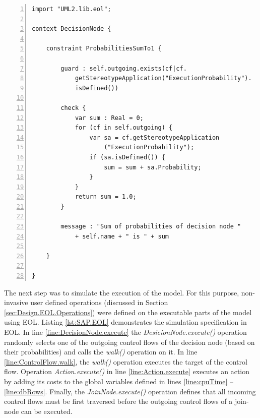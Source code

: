 \begin{lstlisting}[basicstyle=\ttfamily\footnotesize, flexiblecolumns=true, numbers=left, nolol=true, caption=Performance-Annotated Activity Diagram Constraints using EVL, label=lst:SAP.EVL, language=EVL, tabsize=2]
import "UML2.lib.eol";

context DecisionNode {
	
	constraint ProbabilitiesSumTo1 {
		
		guard : self.outgoing.exists(cf|cf.
			getStereotypeApplication("ExecutionProbability").
			isDefined())
		
		check {
			var sum : Real = 0;
			for (cf in self.outgoing) {
				var sa = cf.getStereotypeApplication
					("ExecutionProbability");
				if (sa.isDefined()) {
					sum = sum + sa.Probability;
				}
			}
			return sum = 1.0;
		}
		
		message : "Sum of probabilities of decision node " 
			+ self.name + " is " + sum 
		
	}
	
}
\end{lstlisting}

The next step was to simulate the execution of the model. For this purpose, non-invasive user defined operations (discussed in Section \ref{sec:Design.EOL.Operations}) were defined on the executable parts of the model using EOL. Listing \ref{lst:SAP.EOL} demonstrates the simulation specification in EOL. In line \ref{line:DecisionNode.execute} the \emph{DesicionNode.execute()} operation randomly selects one of the outgoing control flows of the decision node (based on their probabilities) and calls the \emph{walk()} operation on it. In line \ref{line:ControlFlow.walk}, the \emph{walk()} operation executes the target of the control flow. Operation \emph{Action.execute()} in line \ref{line:Action.execute} executes an action by adding its costs to the global variables defined in lines \ref{line:cpuTime} -- \ref{line:dbRows}. Finally, the \emph{JoinNode.execute()} operation defines that all incoming control flows must be first traversed before the outgoing control flows of a join-node can be executed.


